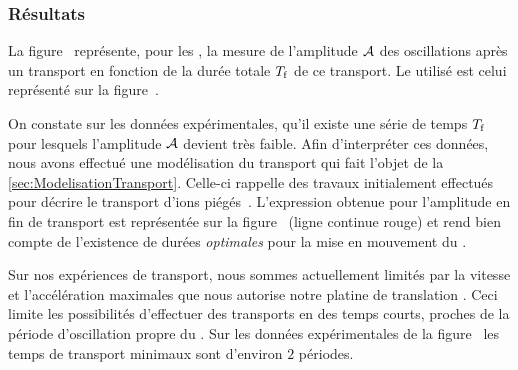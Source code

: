 \subsubsection{Résultats}
La figure~ représente, pour les \confab, la mesure de l'amplitude ${\mathcal{A}}$ des oscillations après un transport en fonction de la durée totale ${T_{\rm f}}$ de ce transport. Le \pacc utilisé est celui représenté sur la figure~.
%
\bfighss
{}
\label{fig:TransportDataAmplFit}
\efigh

On constate sur les données expérimentales, qu'il existe une série de temps ${T_{\rm f}}$ pour lesquels l'amplitude ${\mathcal{A}}$ devient très faible.
Afin d'interpréter ces données, nous avons effectué une modélisation du transport qui fait l'objet de la \autoref{sec:ModelisationTransport}. Celle-ci rappelle des travaux initialement effectués pour décrire le transport d'ions piégés~\cite{RLB06}. L'expression obtenue pour l'amplitude en fin de transport est représentée sur la figure~ (ligne continue rouge) et rend bien compte de l'existence de durées \emph{optimales} pour la mise en mouvement du \pd.

Sur nos expériences de transport, nous sommes actuellement limités par la vitesse et l'accélération maximales que nous autorise notre platine de translation%
\footnotemark.
Ceci limite les possibilités d'effectuer des transports en des temps courts, proches de la période d'oscillation propre du \pd. Sur les données expérimentales de la figure~ les temps de transport minimaux sont d'environ $2$ périodes. %
%

